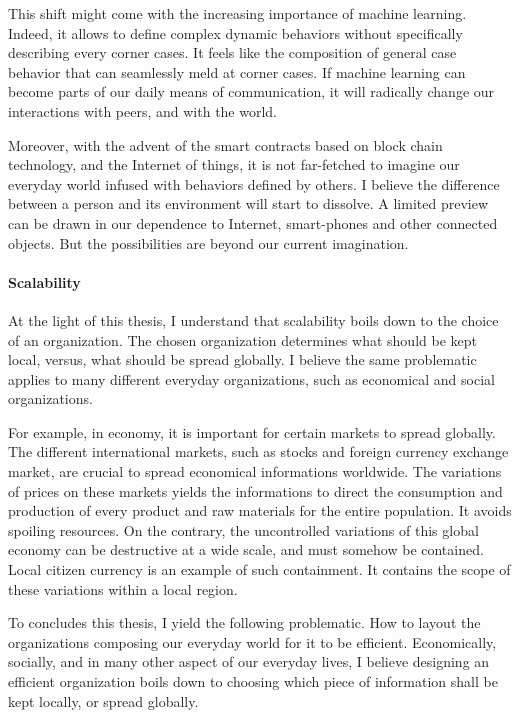 This shift might come with the increasing importance of machine learning.
Indeed, it allows to define complex dynamic behaviors without specifically describing every corner cases.
It feels like the composition of general case behavior that can seamlessly meld at corner cases.
If machine learning can become parts of our daily means of communication, it will radically change our interactions with peers, and with the world.

Moreover, with the advent of the smart contracts based on block chain technology, and the Internet of things, it is not far-fetched to imagine our everyday world infused with behaviors defined by others.
I believe the difference between a person and its environment will start to dissolve.
A limited preview can be drawn in our dependence to Internet, smart-phones and other connected objects.
But the possibilities are beyond our current imagination.

\paragraph{Scalability}

At the light of this thesis, I understand that scalability boils down to the choice of an organization.
The chosen organization determines what should be kept local, versus, what should be spread globally.
I believe the same problematic applies to many different everyday organizations, such as economical and social organizations.

For example, in economy, it is important for certain markets to spread globally.
The different international markets, such as stocks and foreign currency exchange market, are crucial to spread economical informations worldwide.
The variations of prices on these markets yields the informations to direct the consumption and production of every product and raw materials for the entire population.
It avoids spoiling resources.
On the contrary, the uncontrolled variations of this global economy can be destructive at a wide scale, and must somehow be contained.
Local citizen currency is an example of such containment.
It contains the scope of these variations within a local region.

To concludes this thesis, I yield the following problematic.
How to layout the organizations composing our everyday world for it to be efficient.
Economically, socially, and in many other aspect of our everyday lives, I believe designing an efficient organization boils down to choosing which piece of information shall be kept locally, or spread globally.